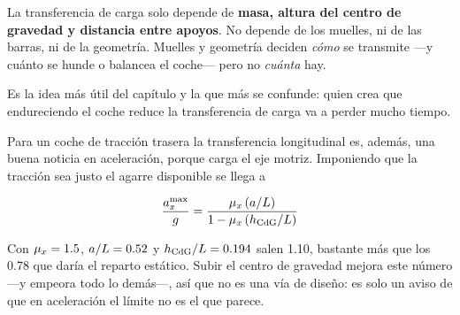 \begin{clave}
La transferencia de carga solo depende de \textbf{masa, altura del centro de
gravedad y distancia entre apoyos}. No depende de los muelles, ni de las
barras, ni de la geometría. Muelles y geometría deciden \emph{cómo} se
transmite ---y cuánto se hunde o balancea el coche--- pero no \emph{cuánta}
hay.

Es la idea más útil del capítulo y la que más se confunde: quien crea que
endureciendo el coche reduce la transferencia de carga va a perder mucho
tiempo.
\end{clave}

Para un coche de tracción trasera la transferencia longitudinal es, además,
una buena noticia en aceleración, porque carga el eje motriz. Imponiendo que la
tracción sea justo el agarre disponible se llega a

\begin{equation}
  \frac{a_x^{\max}}{g} = \frac{\mu_x\,(a/L)}
                              {1 - \mu_x\,(h_{\mathrm{CdG}}/L)}
  \label{eq:traccion_maxima}
\end{equation}

Con $\mu_x = \num{1.5}$, $a/L = \num{0.52}$ y
$h_{\mathrm{CdG}}/L = \num{0.194}$ salen \SI{1.10}{\gacc}, bastante más que los
\SI{0.78}{\gacc} que daría el reparto estático. Subir el centro de gravedad
mejora este número ---y empeora todo lo demás---, así que no es una vía de
diseño: es solo un aviso de que en aceleración el límite no es el que parece.

